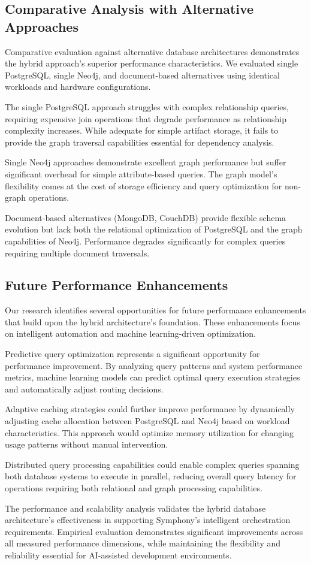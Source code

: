 \subsection*{Comparative Analysis with Alternative Approaches}

Comparative evaluation against alternative database architectures demonstrates the hybrid approach's superior performance characteristics. We evaluated single PostgreSQL, single Neo4j, and document-based alternatives using identical workloads and hardware configurations.

The single PostgreSQL approach struggles with complex relationship queries, requiring expensive join operations that degrade performance as relationship complexity increases. While adequate for simple artifact storage, it fails to provide the graph traversal capabilities essential for dependency analysis.

Single Neo4j approaches demonstrate excellent graph performance but suffer significant overhead for simple attribute-based queries. The graph model's flexibility comes at the cost of storage efficiency and query optimization for non-graph operations.

Document-based alternatives (MongoDB, CouchDB) provide flexible schema evolution but lack both the relational optimization of PostgreSQL and the graph capabilities of Neo4j. Performance degrades significantly for complex queries requiring multiple document traversals.

\subsection*{Future Performance Enhancements}

Our research identifies several opportunities for future performance enhancements that build upon the hybrid architecture's foundation. These enhancements focus on intelligent automation and machine learning-driven optimization.

Predictive query optimization represents a significant opportunity for performance improvement. By analyzing query patterns and system performance metrics, machine learning models can predict optimal query execution strategies and automatically adjust routing decisions.

Adaptive caching strategies could further improve performance by dynamically adjusting cache allocation between PostgreSQL and Neo4j based on workload characteristics. This approach would optimize memory utilization for changing usage patterns without manual intervention.

Distributed query processing capabilities could enable complex queries spanning both database systems to execute in parallel, reducing overall query latency for operations requiring both relational and graph processing capabilities.

The performance and scalability analysis validates the hybrid database architecture's effectiveness in supporting Symphony's intelligent orchestration requirements. Empirical evaluation demonstrates significant improvements across all measured performance dimensions, while maintaining the flexibility and reliability essential for AI-assisted development environments.
